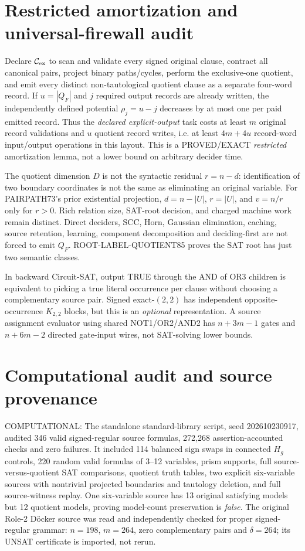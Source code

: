 \documentclass[11pt]{article}
\begin{document}
\section{Restricted amortization and universal-firewall audit}
Declare $\mathcal C_{\rm ex}$ to scan and validate every signed original clause, contract all canonical pairs, project binary paths/cycles, perform the exclusive-one quotient, and emit every distinct non-tautological quotient clause as a separate four-word record. If $u=|Q_F|$ and $j$ required output records are already written, the independently defined potential $\rho_j=u-j$ decreases by at most one per paid emitted record. Thus the \emph{declared explicit-output} task costs at least $m$ original record validations and $u$ quotient record writes, i.e. at least $4m+4u$ record-word input/output operations in this layout. This is a PROVED/EXACT \emph{restricted} amortization lemma, not a lower bound on arbitrary decider time.

The quotient dimension $D$ is not the syntactic residual $r=n-d$: identification of two boundary coordinates is not the same as eliminating an original variable. For PAIRPATH73's prior existential projection, $d=n-|U|$, $r=|U|$, and $v=n/r$ only for $r>0$. Rich relation size, SAT-root decision, and charged machine work remain distinct. Direct deciders, SCC, Horn, Gaussian elimination, caching, source retention, learning, component decomposition and deciding-first are not forced to emit $Q_F$. ROOT-LABEL-QUOTIENT85 proves the SAT root has just two semantic classes.

In backward Circuit-SAT, output TRUE through the AND of OR3 children is equivalent to picking a true literal occurrence per clause without choosing a complementary source pair. Signed exact-$(2,2)$ has independent opposite-occurrence $K_{2,2}$ blocks, but this is an \emph{optional} representation. A source assignment evaluator using shared NOT1/OR2/AND2 has $n+3m-1$ gates and $n+6m-2$ directed gate-input wires, not SAT-solving lower bounds.
\section{Computational audit and source provenance}
COMPUTATIONAL: The standalone standard-library script, seed 202610230917, audited 346 valid signed-regular source formulas, 272,268 assertion-accounted checks and zero failures. It included 114 balanced sign swaps in connected $H_g$ controls, 220 random valid formulas of 3--12 variables, prism supports, full source-versus-quotient SAT comparisons, quotient truth tables, two explicit six-variable sources with nontrivial projected boundaries and tautology deletion, and full source-witness replay. One six-variable source has 13 original satisfying models but 12 quotient models, proving model-count preservation is \emph{false}. The original Role-2 D\"ocker source was read and independently checked for proper signed-regular grammar: $n=198$, $m=264$, zero complementary pairs and $\delta=264$; its UNSAT certificate is imported, not rerun.
\end{document}

